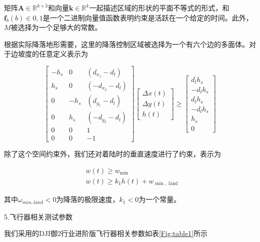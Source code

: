 矩阵$\boldsymbol{A} \in \mathbb{R}^{k \times 3}$和向量$\boldsymbol{k} \in \mathbb{R}^{k}$一起描述区域的形状的平面不等式的形式，和$\boldsymbol{f}_{b}(b) \in {0,1}$是一个二进制向量值函数表明约束是活跃在一个给定的时间。此外，$M$被选择为一个足够大的常数。

根据实际降落地形需要，这里的降落控制区域被选择为一个有六个边的多面体。对于边坡度的任意定义表示为

$$
\left[\begin{array}{ccc}
-h_{s} & 0 & \left(d_{x_{1}}-d_{l}\right) \\
h_{s} & 0 & \left(-d_{x_{2}}-d_{l}\right) \\
0 & -h_{s} & \left(d_{y_{1}}-d_{l}\right) \\
0 & h_{s} & \left(-d_{y_{2}}-d_{l}\right) \\
0 & 0 & 1 \\
0 & 0 & -1
\end{array}\right]\left[\begin{array}{c}
\Delta x(t) \\
\Delta y(t) \\
h(t)
\end{array}\right] \geq\left[\begin{array}{c}
d_{l} h_{s} \\
-d_{l} h_{s} \\
d_{l} h_{s} \\
-d_{l} h_{s} \\
h_{s} \\
0
\end{array}\right]
$$

除了这个空间约束外，我们还对着陆时的垂直速度进行了约束，表示为

$$
\begin{aligned}
&w(t) \geq w_{\min } \\
&w(t) \geq k_{1} h(t)+w_{\min , \text { land }}
\end{aligned}
$$

其中$\omega_{min,land}<0$为降落的极限速度，$k_{1}<0$为一个常量。

5.飞行器相关测试参数

我们采用的DJI御2行业进阶版飞行器相关参数如表\ref{Fig:table1}所示

